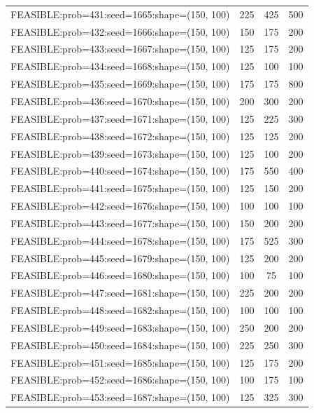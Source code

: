 \begin{longtable}{lccc}
FEASIBLE:prob=431:seed=1665:shape=(150, 100) &      225 &   425 &    500 \\
FEASIBLE:prob=432:seed=1666:shape=(150, 100) &      150 &   175 &    200 \\
FEASIBLE:prob=433:seed=1667:shape=(150, 100) &      125 &   175 &    200 \\
FEASIBLE:prob=434:seed=1668:shape=(150, 100) &      125 &   100 &    100 \\
FEASIBLE:prob=435:seed=1669:shape=(150, 100) &      175 &   175 &    800 \\
FEASIBLE:prob=436:seed=1670:shape=(150, 100) &      200 &   300 &    200 \\
FEASIBLE:prob=437:seed=1671:shape=(150, 100) &      125 &   225 &    300 \\
FEASIBLE:prob=438:seed=1672:shape=(150, 100) &      125 &   125 &    200 \\
FEASIBLE:prob=439:seed=1673:shape=(150, 100) &      125 &   100 &    200 \\
FEASIBLE:prob=440:seed=1674:shape=(150, 100) &      175 &   550 &    400 \\
FEASIBLE:prob=441:seed=1675:shape=(150, 100) &      125 &   150 &    200 \\
FEASIBLE:prob=442:seed=1676:shape=(150, 100) &      100 &   100 &    100 \\
FEASIBLE:prob=443:seed=1677:shape=(150, 100) &      150 &   200 &    200 \\
FEASIBLE:prob=444:seed=1678:shape=(150, 100) &      175 &   525 &    300 \\
FEASIBLE:prob=445:seed=1679:shape=(150, 100) &      125 &   200 &    200 \\
FEASIBLE:prob=446:seed=1680:shape=(150, 100) &      100 &    75 &    100 \\
FEASIBLE:prob=447:seed=1681:shape=(150, 100) &      225 &   200 &    200 \\
FEASIBLE:prob=448:seed=1682:shape=(150, 100) &      100 &   100 &    100 \\
FEASIBLE:prob=449:seed=1683:shape=(150, 100) &      250 &   200 &    200 \\
FEASIBLE:prob=450:seed=1684:shape=(150, 100) &      225 &   250 &    300 \\
FEASIBLE:prob=451:seed=1685:shape=(150, 100) &      125 &   175 &    200 \\
FEASIBLE:prob=452:seed=1686:shape=(150, 100) &      100 &   175 &    100 \\
FEASIBLE:prob=453:seed=1687:shape=(150, 100) &      125 &   325 &    300 \\

\end{longtable}
